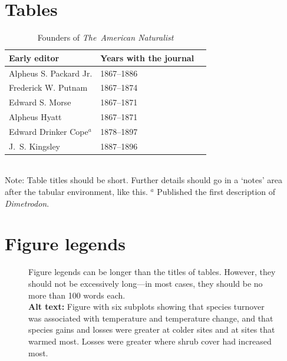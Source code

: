 ﻿\documentclass[11pt]{article}
\begin{document}
\newpage{}

\section*{Tables}
\renewcommand{\thetable}{\arabic{table}}
\setcounter{table}{0}

\begin{table}[h]
\caption{Founders of \textit{The~American Naturalist}}
\label{Table:Founders}
\centering
\begin{tabular}{lll}\hline
Early editor            & Years with the journal \\ \hline
Alpheus S. Packard Jr.  & 1867--1886 \\
Frederick W. Putnam     & 1867--1874 \\ 
Edward S. Morse         & 1867--1871 \\ 
Alpheus Hyatt           & 1867--1871 \\
Edward Drinker Cope$^a$ & 1878--1897 \\
J.~S. Kingsley          & 1887--1896 \\ \hline 
\end{tabular}
\bigskip{}
\\
{\footnotesize Note: Table titles should be short. Further details should go in a `notes' area after the tabular environment, like this. $^a$ Published the first description of \textit{Dimetrodon}.}
\end{table}

\newpage{}

\section*{Figure legends}


\begin{figure}[h!]
\caption{Figure legends can be longer than the titles of tables. However, they should not be excessively long---in most cases, they should be no more than 100 words each. \\
\textbf{Alt text:} Figure with six subplots showing that species turnover was associated with temperature and temperature change, and that species gains and losses were greater at colder sites and at sites that warmed most. Losses were greater where shrub cover had increased most.}
\label{Fig:OkapiHorn}
\end{figure}
\end{document}
